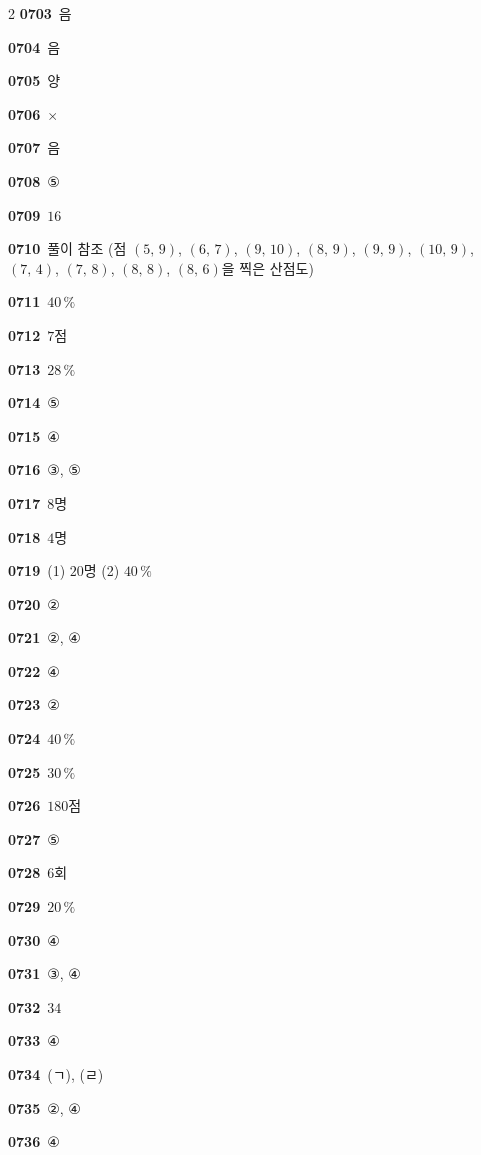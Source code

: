 \documentclass[10pt,a4paper]{article}
\begin{document}
\begin{multicols}{2}
\noindent\textbf{0703}\ 음\par
\noindent\textbf{0704}\ 음\par
\noindent\textbf{0705}\ 양\par
\noindent\textbf{0706}\ $\times$\par
\noindent\textbf{0707}\ 음\par
\noindent\textbf{0708}\ ⑤\par
\noindent\textbf{0709}\ $16$\par
\noindent\textbf{0710}\ 풀이 참조 (점 $(5,\,9)$, $(6,\,7)$, $(9,\,10)$, $(8,\,9)$, $(9,\,9)$, $(10,\,9)$, $(7,\,4)$, $(7,\,8)$, $(8,\,8)$, $(8,\,6)$을 찍은 산점도)\par
\noindent\textbf{0711}\ $40\,\%$\par
\noindent\textbf{0712}\ $7$점\par
\noindent\textbf{0713}\ $28\,\%$\par
\noindent\textbf{0714}\ ⑤\par
\noindent\textbf{0715}\ ④\par
\noindent\textbf{0716}\ ③, ⑤\par
\noindent\textbf{0717}\ $8$명\par
\noindent\textbf{0718}\ $4$명\par
\noindent\textbf{0719}\ (1) $20$명 (2) $40\,\%$\par
\noindent\textbf{0720}\ ②\par
\noindent\textbf{0721}\ ②, ④\par
\noindent\textbf{0722}\ ④\par
\noindent\textbf{0723}\ ②\par
\noindent\textbf{0724}\ $40\,\%$\par
\noindent\textbf{0725}\ $30\,\%$\par
\noindent\textbf{0726}\ $180$점\par
\noindent\textbf{0727}\ ⑤\par
\noindent\textbf{0728}\ $6$회\par
\noindent\textbf{0729}\ $20\,\%$\par
\noindent\textbf{0730}\ ④\par
\noindent\textbf{0731}\ ③, ④\par
\noindent\textbf{0732}\ $34$\par
\noindent\textbf{0733}\ ④\par
\noindent\textbf{0734}\ (ㄱ), (ㄹ)\par
\noindent\textbf{0735}\ ②, ④\par
\noindent\textbf{0736}\ ④\par

\end{multicols}
\end{document}
